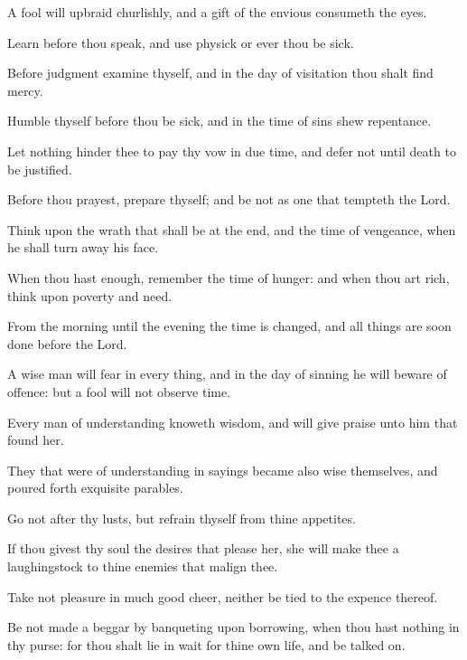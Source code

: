 {\par }{\PP {}A fool will upbraid churlishly, and a gift of the envious consumeth the eyes.
\par }{\PP {}Learn before thou speak, and use physick or ever thou be sick.
\par }{\PP {}Before judgment examine thyself, and in the day of visitation thou shalt find mercy.
\par }{\PP {}Humble thyself before thou be sick, and in the time of sins shew repentance.
\par }{\PP {}Let nothing hinder thee to pay thy vow in due time, and defer not until death to be justified.
\par }{\PP {}Before thou prayest, prepare thyself; and be not as one that tempteth the Lord.
\par }{\PP {}Think upon the wrath that shall be at the end, and the time of vengeance, when he shall turn away his face.
\par }{\PP {}When thou hast enough, remember the time of hunger: and when thou art rich, think upon poverty and need.
\par }{\PP {}From the morning until the evening the time is changed, and all things are soon done before the Lord.
\par }{\PP {}A wise man will fear in every thing, and in the day of sinning he will beware of offence: but a fool will not observe time.
\par }{\PP {}Every man of understanding knoweth wisdom, and will give praise unto him that found her.
\par }{\PP {}They that were of understanding in sayings became also wise themselves, and poured forth exquisite parables.
\par }{\PP {}Go not after thy lusts, but refrain thyself from thine appetites.
\par }{\PP {}If thou givest thy soul the desires that please her, she will make thee a laughingstock to thine enemies that malign thee.
\par }{\PP {}Take not pleasure in much good cheer, neither be tied to the expence thereof.
\par }{\PP {}Be not made a beggar by banqueting upon borrowing, when thou hast nothing in thy purse: for thou shalt lie in wait for thine own life, and be talked on.

}
